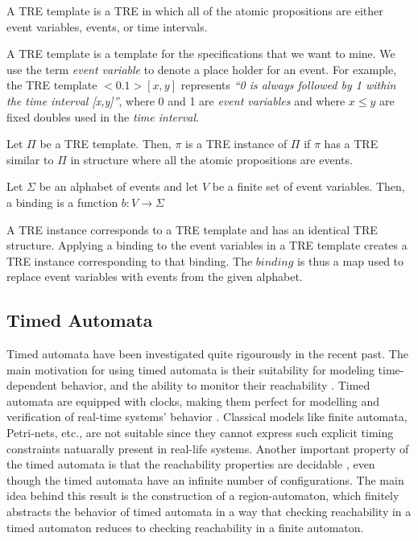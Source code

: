 \documentclass[]{sigplanconf}
\begin{document}
\begin{defns}
A TRE template is a TRE in which all of the atomic propositions are either event variables, events, or time intervals.
\end{defns}

A TRE template is a template for the specifications that we want to mine. We use the term \emph{event variable} to denote a place holder for an event. For example, the TRE template $<0.1>[x,y]$ represents \emph{``0 is always followed by 1 within the time interval [x,y]''}, where 0 and 1 are \emph{event variables} and where $x \le y$ are fixed doubles used in the \emph{time interval}.


\begin{defns}
Let $\Pi$ be a TRE template. Then, $\pi$ is a TRE instance of $\Pi$ if $\pi$ has a TRE similar to $\Pi$ in structure where all the atomic propositions are events.
\end{defns}

\begin{defns}[Binding]
Let $\Sigma$ be an alphabet of events and let $V$ be a finite set of event variables. Then, a binding is a function $b \colon V \rightarrow \Sigma$
\end{defns}

A TRE instance corresponds to a TRE template and has an identical TRE structure. Applying a binding to the event variables in a TRE template creates a TRE instance corresponding to that binding. The $binding$ is thus a map used to replace event variables with events from the given alphabet.

\subsection{Timed Automata}

Timed automata \cite{AD94} have been investigated quite rigourously in the recent past. The main motivation for using timed automata is their suitability for modeling time-dependent behavior, and the ability to monitor their reachability \cite{LPY97}. Timed automata are equipped with clocks, making them perfect for modelling and verification of real-time systems' behavior \cite{Alur1990, Alur1994183}. Classical models like finite automata, Petri-nets, etc., are not suitable since they cannot express such explicit timing constraints natuarally present in real-life systems. Another important property of the timed automata is that the reachability properties are decidable \cite{Alur1994183}, even though the timed automata have an infinite number of configurations. The main idea behind this result is the construction of a region-automaton, which finitely abstracts the behavior of timed automata in a way that checking reachability in a timed automaton reduces to checking reachability in a finite automaton.
\end{document}
